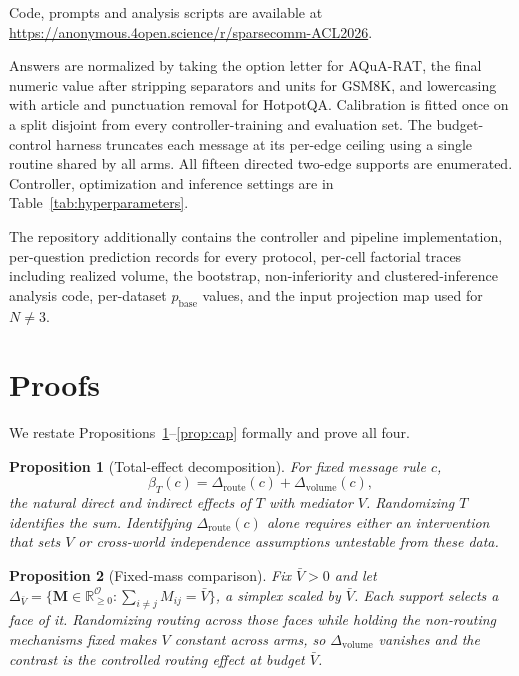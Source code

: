 \documentclass[11pt]{article}
\newtheorem{proposition}{Proposition}
\begin{document}
Code, prompts and analysis scripts are available at
\url{https://anonymous.4open.science/r/sparsecomm-ACL2026}.

Answers are normalized by taking the option letter for AQuA-RAT, the final
numeric value after stripping separators and units for GSM8K, and lowercasing
with article and punctuation removal for HotpotQA. Calibration is fitted once on
a split disjoint from every controller-training and evaluation set. The
budget-control harness truncates each message at its per-edge ceiling using a
single routine shared by all arms. All fifteen directed two-edge supports are
enumerated. Controller, optimization and inference settings are in
Table~\ref{tab:hyperparameters}.

The repository additionally contains the controller and pipeline
implementation, per-question prediction records for every protocol, per-cell
factorial traces including realized volume, the bootstrap, non-inferiority and
clustered-inference analysis code, per-dataset $p_{\mathrm{base}}$ values, and
the input projection map used for $N\neq3$.

\section{Proofs}
\label{app:proofs}

We restate Propositions~\ref{prop:nonid}--\ref{prop:cap} formally and prove all four.

\begin{proposition}[Total-effect decomposition]
\label{prop:nonid}
For fixed message rule $c$,
\[
\beta_T(c)=\Delta_{\mathrm{route}}(c)+\Delta_{\mathrm{volume}}(c),
\]
the natural direct and indirect effects of $T$ with mediator $V$. Randomizing
$T$ identifies the sum. Identifying $\Delta_{\mathrm{route}}(c)$ alone requires
either an intervention that sets $V$ or cross-world independence assumptions
untestable from these data.
\end{proposition}

\begin{proposition}[Fixed-mass comparison]
\label{prop:face}
Fix $\bar V>0$ and let $\Delta_{\bar V}=\{\mathbf{M}\in
\mathbb{R}^{\mathcal{O}}_{\ge0}:\sum_{i\neq j}M_{ij}=\bar V\}$, a simplex scaled
by $\bar V$. Each support selects a face of it. Randomizing routing across those
faces while holding the non-routing mechanisms fixed makes $V$ constant across
arms, so $\Delta_{\mathrm{volume}}$ vanishes and the contrast is the controlled
routing effect at budget $\bar V$.
\end{proposition}
\end{document}
